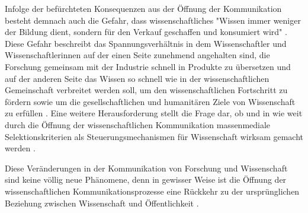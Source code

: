 Infolge der befürchteten Konsequenzen aus der Öffnung der Kommunikation besteht demnach auch die Gefahr, dass wissenschaftliches "Wissen immer weniger der Bildung dient, sondern für den Verkauf geschaffen und konsumiert wird" \cite{hagner_2015_sache_buches}. Diese Gefahr beschreibt das Spannungsverhältnis in dem Wissenschaftler und Wissenschaftlerinnen auf der einen Seite zunehmend angehalten sind, die Forschung gemeinsam mit der Industrie schnell in Produkte zu übersetzen und auf der anderen Seite das Wissen so schnell wie in der wissenschaftlichen Gemeinschaft verbreitet werden soll, um den wissenschaftlichen Fortschritt zu fördern sowie um die gesellschaftlichen und humanitären Ziele von Wissenschaft zu erfüllen \cite{harmon_2012_commercialization} \cite{Woelfle_2011}. Eine weitere Herausforderung stellt die Frage dar, ob und in wie weit durch die Öffnung der wissenschaftlichen Kommunikation massenmediale Selektionskriterien als Steuerungsmechanismen für Wissenschaft wirksam gemacht werden \cite{bbaw_publizieren_2015}.

Diese Veränderungen in der Kommunikation von Forschung und Wissenschaft sind keine völlig neue Phänomene, denn in gewisser Weise ist die Öffnung der wissenschaftlichen Kommunikationsprozesse eine Rückkehr zu der ursprünglichen Beziehung zwischen Wissenschaft und Öffentlichkeit \cite{Konneker_2013} \cite{weingart_2005_wissenschaft}.

